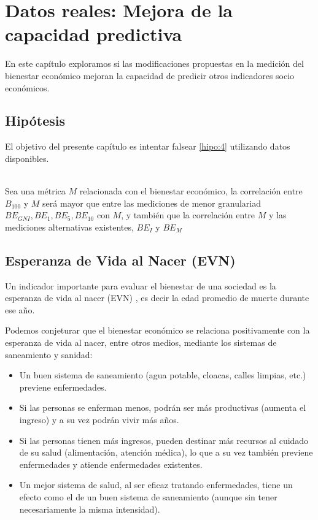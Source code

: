 \chapter{Datos reales: Mejora de la capacidad predictiva} \label{chapter:datos_reales_otros_indicadores}

En este capítulo exploramos si las modificaciones propuestas en la medición del bienestar económico mejoran la capacidad de predicir otros indicadores socio económicos.

\section{Hipótesis}

El objetivo del presente capítulo es intentar falsear \ref{hipo:4} utilizando datos disponibles.

\begin{hipotesis}\label{hipo:4}
    \\
    Sea una métrica $M$ relacionada con el bienestar económico, la correlación entre $B_{100}$ y $M$ será mayor que entre las mediciones de menor granulariad $BE_{GNI}, BE_1, BE_5, BE_{10}$ con $M$, y también que la correlación entre $M$ y las mediciones alternativas existentes, $BE_I$ y $BE_M$
\end{hipotesis}


\section{Esperanza de Vida al Nacer (EVN)}

Un indicador importante para evaluar el bienestar de una sociedad es la esperanza de vida al nacer (EVN) \cite{worldbank_health_data}, es decir la edad promedio de muerte durante ese año. 

Podemos conjeturar que el bienestar económico se relaciona positivamente con la esperanza de vida al nacer, entre otros medios, mediante los sistemas de saneamiento y sanidad:

\begin{itemize}
    \item Un buen sistema de saneamiento (agua potable, cloacas, calles limpias, etc.) previene enfermedades.
    \item Si las personas se enferman menos, podrán ser más productivas (aumenta el ingreso) y a su vez podrán vivir más años.
    \item Si las personas tienen más ingresos, pueden destinar más recursos al cuidado de su salud (alimentación, atención médica), lo que a su vez también previene enfermedades y atiende enfermedades existentes.
    \item Un mejor sistema de salud, al ser eficaz tratando enfermedades, tiene un efecto como el de un buen sistema de saneamiento (aunque sin tener necesariamente la misma intensidad).
\end{itemize}

